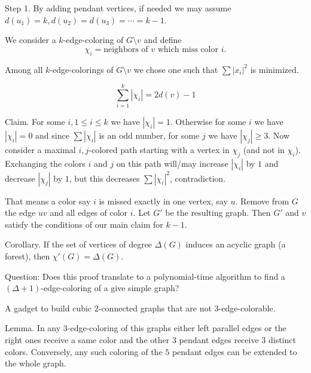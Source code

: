\documentclass[12pt,a4paper]{article}
\begin{document}
Step 1. By adding pendant vertices, if needed we may assume
\(d(u_1) = k, d(u_2) = d(u_3) =\cdots = k - 1\).

We consider a \(k\)-edge-coloring of \(G \setminus v\) and define
\[\chi_i = {\text{neighbors of } v \text{ which miss color } i}.\]

Among all \(k\)-edge-colorings of \(G\setminus v\) we chose one such that
\(\sum{|x_i|}^2\) is minimized.

\[\sum_{i=1}^k|\chi_i| = 2d(v)-1\]

Claim. For some \(i, 1 \leq i \leq k\) we have \(|\chi_i| = 1\). Otherwise for
some \(i\) we have \(|\chi_i| = 0\) and since \(\sum|\chi_i|\) is an odd number,
for some \(j\) we have \(|\chi_j| \geq 3\). Now consider a maximal
\({i, j}\)-colored path starting with a vertex in \(\chi_j\) (and not in
\(\chi_i\)).  Exchanging the colors \(i\) and \(j\) on this path will/may
increase \(|\chi_i|\) by \(1\) and decrease \(|\chi_j|\) by \(1\), but this
decreases \(\sum{|\chi_i|}^2\), contradiction.

That means a color say \(i\) is missed exactly in one vertex, say \(u\). Remove
from \(G\) the edge \(u v\) and all edges of color \(i\). Let \(G'\) be the
resulting graph. Then \(G'\) and \(v\) satisfy the conditions of our main claim
for \(k-1\).

Corollary. If the set of vertices of degree \(\Delta(G)\) induces an acyclic
graph (a forest), then \(\chi'(G) = \Delta(G)\).

Question: Does this proof translate to a polynomial-time algorithm to find a
\((\Delta + 1)\)-edge-coloring of a give simple graph?

A gadget to build cubic \(2\)-connected graphs that are not
\(3\)-edge-colorable.

\begin{center}
\end{center}

Lemma. In any \(3\)-edge-coloring of this graphs either left parallel edges or
the right ones receive a same color and the other \(3\) pendant edges receive
\(3\) distinct colors. Conversely, any such coloring of the \(5\) pendant edges
can be extended to the whole graph.
\end{document}
